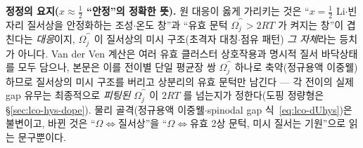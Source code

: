 \begin{srcbox}
\textbf{정정의 요지($x\!\approx\!\tfrac12$ ``안정''의 정확한 뜻).} 원 대응이 옳게 가리키는 것은 ``$x{=}\tfrac12$
Li$\cdot$빈자리 질서상을 안정화하는 조성$\cdot$온도 창''과 ``유효 문턱 $\Omega_j^\cat>2RT$ 가 켜지는 창''이 겹친다는
\emph{대응}이지, $\Omega_j^\cat$ 이 질서상의 미시 구조(초격자 대칭$\cdot$점유 패턴) \emph{그 자체}라는 등치가
아니다. Van der Ven 계산은 여러 유효 클러스터 상호작용과 명시적 질서 바닥상태를 모두 담으나, 본문은 이를
전이별 단일 평균장 쌍 $\Omega_j^\cat$ 하나로 축약(정규용액 이중웰)하므로 질서상의 미시 구조를 버리고 상분리의
유효 문턱만 남긴다 --- 각 전이의 실제 gap 유무는 최종적으로 \emph{피팅된} $\Omega_j^\cat$ 이 $2RT$ 를 넘는지가
정한다(도핑 정량형은 \S\ref{sec:lco-hys-dope}). 물리 골격(정규용액 이중웰$\cdot$spinodal gap
식~\eqref{eq:lco-dUhys})은 불변이고, 바뀐 것은 ``$\Omega\Leftrightarrow$질서상''을 ``$\Omega\Leftrightarrow$유효
2상 문턱, 미시 질서는 기원''으로 읽는 문구뿐이다.
\end{srcbox}


